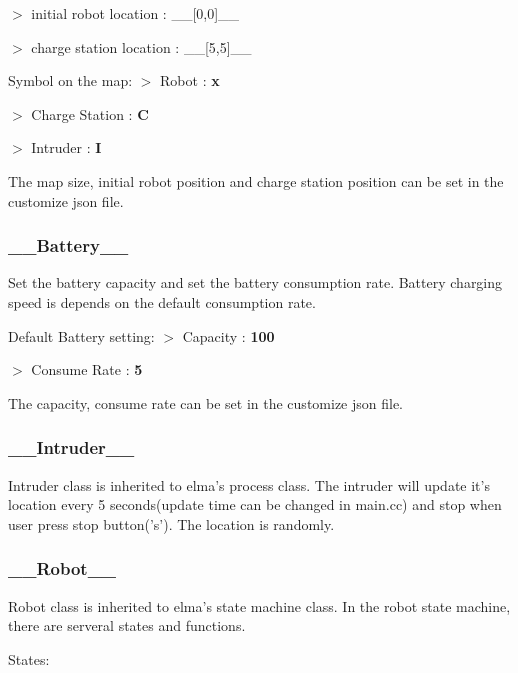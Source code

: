$>$ initial robot location \+: \+\_\+\+\_\+\mbox{[}0,0\mbox{]}\+\_\+\+\_\+

$>$ charge station location \+: \+\_\+\+\_\+\mbox{[}5,5\mbox{]}\+\_\+\+\_\+

Symbol on the map\+: $>$ Robot \+: {\bfseries x}

$>$ Charge Station \+: {\bfseries C}

$>$ Intruder \+: {\bfseries I}

The map size, initial robot position and charge station position can be set in the customize json file.

\subsubsection*{\+\_\+\+\_\+\+Battery\+\_\+\+\_\+}

Set the battery capacity and set the battery consumption rate. Battery charging speed is depends on the default consumption rate.

Default Battery setting\+: $>$ Capacity \+: {\bfseries 100}

$>$ Consume Rate \+: {\bfseries 5}

The capacity, consume rate can be set in the customize json file.

\subsubsection*{\+\_\+\+\_\+\+Intruder\+\_\+\+\_\+}

Intruder class is inherited to elma's process class. The intruder will update it's location every 5 seconds(update time can be changed in main.\+cc) and stop when user press stop button('s'). The location is randomly.

\subsubsection*{\+\_\+\+\_\+\+Robot\+\_\+\+\_\+}

Robot class is inherited to elma's state machine class. In the robot state machine, there are serveral states and functions.

States\+:




